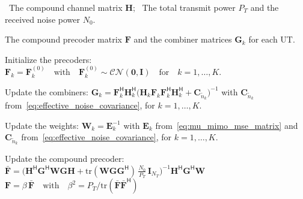 \begin{algorithm}[!htbp]
\caption{\acs{WMMSE} Precoding}
\label{alg:wmmse_precoding}
\begin{algorithmic}[1]

    \Require
    \Statex \hspace{-\algorithmicindent} \textbullet \, The compound channel matrix $\mathbf{H}$;
    \Statex \hspace{-\algorithmicindent} \textbullet \, The total transmit power $P_T$ and the received noise power $N_0$.

    \Ensure The compound precoder matrix $\mathbf{F}$ and the combiner matrices $\mathbf{G}_k$ for each \ac{UT}.

    \medskip
    \State Initialize the precoders:
    \Statex $\mathbf{F}_k = \mathbf{F}_k^{(0)} \quad \text{with} \quad \mathbf{F}_k^{(0)} \sim \mathcal{CN}(\mathbf{0}, \mathbf{I}) \quad \text{for} \quad k = 1, \dots, K$.

    \vspace{0.2\baselineskip}
    \Repeat
        
        \vspace{0.2\baselineskip}
        \State Update the combiners:
        \Statex \hspace{\algorithmicindent}
        $\mathbf{G}_k = \mathbf{F}_k^{\mathsf{H}} \mathbf{H}_k^{\mathsf{H}} \big(\mathbf{H}_k \mathbf{F}_k \mathbf{F}_k^{\mathsf{H}} \mathbf{H}_k^{\mathsf{H}} + \mathbf{C}_{\tilde{n}_k}\big)^{-1}$ 
        \hspace{0.1cm} with $\mathbf{C}_{\tilde{n}_k}$ from~\eqref{eq:effective_noise_covariance}, 
        \hspace{0.05cm} for $k = 1, \dots, K.$

        \vspace{0.2\baselineskip}
        \State Update the weights:
        \Statex \hspace{\algorithmicindent} $\mathbf{W}_k = \mathbf{E}_k^{-1}$
        \hspace{0.1cm} with $\mathbf{E}_k$ from~\eqref{eq:mu_mimo_mse_matrix} and $\mathbf{C}_{\tilde{n}_k}$ from~\eqref{eq:effective_noise_covariance},
        \hspace{0.05cm} for $k = 1, \dots, K$.

        \vspace{0.2\baselineskip}
        \State Update the compound precoder:
        \Statex \hspace{\algorithmicindent} $\bar{\mathbf{F}} = \Big(\mathbf{H}^{\mathsf{H}} \mathbf{G}^{\mathsf{H}} \mathbf{W} \mathbf{G} \mathbf{H} + \mathrm{tr}(\mathbf{W} \mathbf{G} \mathbf{G}^{\mathsf{H}}) \, \frac{N_0}{P_T} \, \mathbf{I}_{N_T}\Big)^{-1} \mathbf{H}^{\mathsf{H}} \mathbf{G}^{\mathsf{H}} \mathbf{W}$
        \Statex \hspace{\algorithmicindent} $\mathbf{F} = \beta \, \bar{\mathbf{F}} \quad \text{with} \quad \beta^2 = P_T / \mathrm{tr}(\bar{\mathbf{F}} \bar{\mathbf{F}}^{\mathsf{H}})$


\end{algorithmic}
\end{algorithm}
